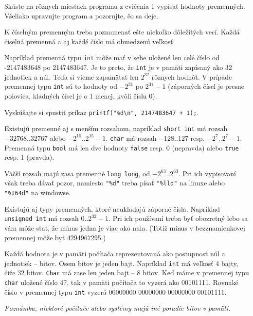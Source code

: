  Skúste na rôznych miestach programu z cvičenia 1 vypísať hodnoty
premenných. Všeliako upravujte program a pozorujte, čo sa deje.


K číselným premenným treba poznamenať ešte niekoľko dôležitých vecí.  Každá
číselná premenná a aj každé číslo má obmedzenú veľkosť.

Napríklad premenná typu \verb!int! môže mať v sebe uložené len celé číslo od
-2147483648 po 2147483647. Je to preto, že \verb!int! je v pamäti zapísaný ako
32 jednotiek a núl. Teda si vieme zapamätať len $2^{32}$ rôznych hodnôt.  V
prípade premennej typu \verb!int! sú to hodnoty od $-2^{31}$ po $2^{31}-1$
(záporných čísel je presne polovica, kladných čísel je o 1 menej, kvôli číslu
0).

 Vyskúšajte si spustiť príkaz \verb!printf("%d\n", 2147483647 + 1);!.

\medskip

Existujú premenné aj s menším rozsahom, napríklad \verb!short int! má rozsah
$-32768..32767$ alebo $-2^{15}..2^{15}-1$.  \verb!char! má rozsah $-128..127$
resp. $-2^7..2^7-1$. Premenná typu \verb!bool! má len dve hodnoty 
\verb!false! resp. 0 (nepravda) alebo \verb!true! resp. 1 (pravda).

Väčší rozsah majú zasa premenné \verb!long long!, od $-2^{63}..2^{63}$. Pri ich
vypisovaní však treba dávať pozor, namiesto \verb!"%d"! treba písať
\verb!"%lld"! na linuxe alebo \verb!"%I64d"! na windowse.

Existujú aj typy premenných, ktoré neukladajú záporné čísla. Napríklad
\verb!unsigned int! má rozsah $0..2^{32}-1$.  Pri ich používaní treba byť
obozretný lebo sa vám môže stať, že mínus jedna je viac ako nula.  (Totiž mínus
v bezznamienkovej premennej môže byť 4294967295.)


Každá hodnota je v pamäti počítača reprezentovaná ako postupnosť núl a
jednotiek -- bitov. Osem bitov je jeden bajt. Napríklad \verb!int! má veľkosť 4
bajty, čiže 32 bitov. \verb!Char! má zase len jeden bajt -- 8 bitov. Keď máme v
premennej typu \verb!char! uložené číslo 47, tak v pamäti počítača to vyzerá
ako 00101111. Rovnaké číslo v premennej typu \verb!int! vyzerá 00000000
00000000 00000000 00101111. 

\textit{Poznámka, niektoré počítače alebo systémy majú iné poradie bitov v
pamäti.}

